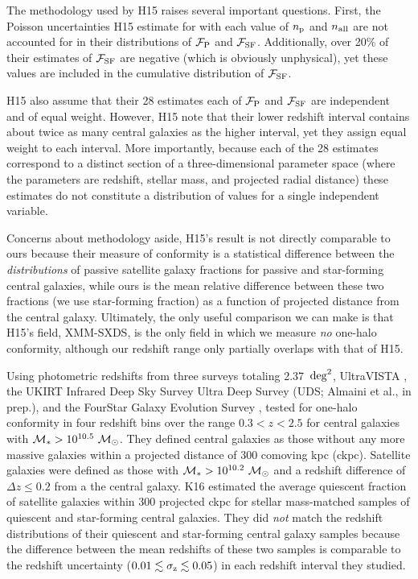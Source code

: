 The methodology used by H15 raises several important questions.
First, the Poisson uncertainties H15 estimate for with each value of $\np$ and $\nall$ are not accounted for in their distributions of $\fP$ and $\fSF$.
Additionally, over 20\% of their estimates of $\fSF$ are negative (which is obviously unphysical), yet these values are included in the cumulative distribution of $\fSF$.

H15 also assume that their 28 estimates each of $\fP$ and $\fSF$ are independent and of equal weight.
However, H15 note that their lower redshift interval contains about twice as many central galaxies as the higher interval, yet they assign equal weight to each interval.
More importantly, because each of the 28 estimates correspond to a distinct section of a three-dimensional parameter space (where the parameters are redshift, stellar mass, and projected radial distance) these estimates do not constitute a distribution of values for a single independent variable.

Concerns about methodology aside, H15's result is not directly comparable to ours because their measure of conformity is a statistical difference between the \emph{distributions} of passive satellite galaxy fractions for passive and star-forming central galaxies, while ours is the mean relative difference between these two fractions (we use star-forming fraction) as a function of projected distance from the central galaxy.
Ultimately, the only useful comparison we can make is that H15's field, XMM-SXDS, is the only field in which we measure \emph{no} one-halo conformity, although our redshift range only partially overlaps with that of H15.


Using photometric redshifts from three surveys totaling 2.37~$\degsq$,
UltraVISTA \citep{McCracken12},
the UKIRT Infrared Deep Sky Survey \citep[UKIDSS;][]{Lawrence07} Ultra Deep Survey (UDS; Almaini et al., in prep.),
and the FourStar Galaxy Evolution Survey \citep[ZFOURGE;][]{Spitler12},
\citet[][hereafter K16]{Kawinwanichakij16} tested for one-halo conformity in four redshift bins over the range ${0.3 < z < 2.5}$ for central galaxies with ${\mstar>10^{10.5}~\msun}$.
They defined central galaxies as those without any more massive galaxies within a projected distance of 300 comoving kpc (ckpc).
Satellite galaxies were defined as those with ${\mstar>10^{10.2}~\msun}$ and a redshift difference of ${\Delta z \le 0.2}$ from a the central galaxy.
K16 estimated the average quiescent fraction of satellite galaxies within 300 projected ckpc for stellar mass-matched samples of quiescent and star-forming central galaxies.
They did \emph{not} match the redshift distributions of their quiescent and star-forming central galaxy samples because the difference between the mean redshifts of these two samples is comparable to the redshift uncertainty (${0.01 \lesssim \sigmaz \lesssim 0.05}$) in each redshift interval they studied.

